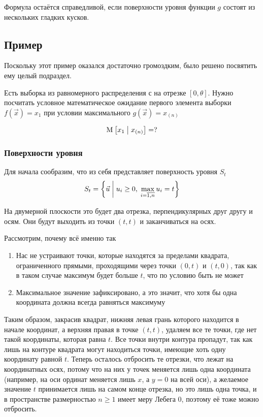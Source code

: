 \begin{remark}
  Формула остаётся справедливой,
  если поверхности уровня функции $g$ состоят из нескольких гладких кусков.
\end{remark}

\subsection{Пример}
Поскольку этот пример оказался достаточно громоздким,
было решено посвятить ему целый подраздел.

Есть выборка \xsample из равномерного распределения
с на отрезке $\left[ 0, \theta \right]$.
Нужно посчитать условное математическое ожидание
первого элемента выборки $f\left( \vec{x} \right) = x_1$
при условии максимального $g\left( \vec{x} \right) = x_{\left( n \right)}$

$$\operatorname{M}_{} \left[ x_1 \;\middle|\; x_{\left( n \right)} \right] = ?$$

\subsubsection{Поверхности уровня}
Для начала сообразим, что из себя представляет поверхность уровня
$S_t$
$$S_t = \left\{ \vec{u} \;\middle|\;
  u_i \ge 0,\; \max_{i= \overline{1,n}} u_i = t \right\}$$

На двумерной плоскости это будет два отрезка,
перпендикулярных друг другу и осям.
Они будут выходить из точки $\left( t, t \right)$
и заканчиваться на осях.

Рассмотрим, почему всё именно так
\begin{enumerate}
  \item Нас не устраивают точки, которые находятся за пределами
      квадрата, ограниченного прямыми, проходящими через точки
      $\left( 0, t \right)$ и $\left( t, 0 \right)$,
      так как в таком случае максимум будет больше $t$,
      что по условию быть не может
  \item Максимальное значение зафиксировано, а это значит,
      что хотя бы одна координата должна
      всегда равняться максимуму
\end{enumerate}

Таким образом, закрасив квадрат, нижняя левая грань которого
находится в начале координат, а верхняя правая в точке $\left( t, t \right)$,
удаляем все те точки, где нет такой координаты, которая равна $t$.
Все точки внутри контура пропадут, так как лишь на контуре квадрата
могут находиться точки, имеющие хоть одну координату равной $t$.
Теперь осталось отбросить те отрезки, что лежат на координатных осях,
потому что на них у точек меняется лишь одна координата
(например, на оси ординат меняется лишь $x$, а $y=0$ на всей оси),
а желаемое значение $t$ принимается лишь на самом конце отрезка,
но это лишь одна точка, и в пространстве размерностью $n \ge 1$
имеет меру Лебега $0$, поэтому её тоже можно отбросить.

